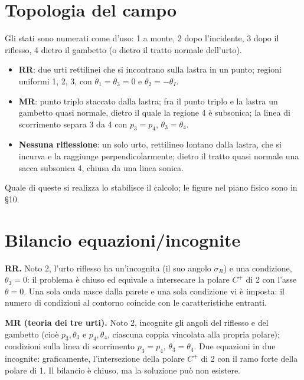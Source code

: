 \documentclass[11pt,a4paper]{article}
\newcommand{\Cp}{C^{+}}
\begin{document}
\section{Topologia del campo}
Gli stati sono numerati come d'uso: 1 a monte, 2 dopo l'incidente, 3 dopo il riflesso, 4 dietro il gambetto
(o dietro il tratto normale dell'urto).
\begin{itemize}
\item \textbf{RR}: due urti rettilinei che si incontrano sulla lastra in un punto; regioni uniformi 1, 2, 3, con
  $\theta_1=\theta_3=0$ e $\theta_2=-\theta_I$.
\item \textbf{MR}: punto triplo staccato dalla lastra; fra il punto triplo e la lastra un gambetto quasi normale,
  dietro il quale la regione 4 è subsonica; la linea di scorrimento separa 3 da 4 con $p_3=p_4$, $\theta_3=\theta_4$.
\item \textbf{Nessuna riflessione}: un solo urto, rettilineo lontano dalla lastra, che si incurva e la raggiunge
  perpendicolarmente; dietro il tratto quasi normale una sacca subsonica 4, chiusa da una linea sonica.
\end{itemize}
Quale di queste si realizza lo stabilisce il calcolo; le figure nel piano fisico sono in §10.

\section{Bilancio equazioni/incognite}
\textbf{RR.} Noto 2, l'urto riflesso ha un'incognita (il suo angolo $\sigma_R$) e una condizione, $\theta_3=0$: il
problema è chiuso ed equivale a intersecare la polare $\Cp$ di 2 con l'asse $\theta=0$. Una sola onda nasce dalla
parete e una sola condizione vi è imposta: il numero di condizioni al contorno coincide con le caratteristiche
entranti.

\textbf{MR (teoria dei tre urti).} Noto 2, incognite gli angoli del riflesso e del gambetto (cioè $p_3,\theta_3$ e
$p_4,\theta_4$, ciascuna coppia vincolata alla propria polare); condizioni sulla linea di scorrimento $p_3=p_4$,
$\theta_3=\theta_4$. Due equazioni in due incognite: graficamente, l'intersezione della polare $\Cp$ di 2 con il ramo
forte della polare di 1. Il bilancio è chiuso, ma la soluzione può non esistere.

\end{document}
